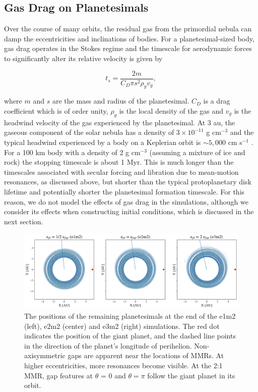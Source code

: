 \subsection{Gas Drag on Planetesimals}\label{sec:pl_drag}

Over the course of many orbits, the residual gas from the primordial nebula can damp the eccentricities and inclinations of 
bodies. For a planetesimal-sized body, gas drag operates in the Stokes regime and the timescale for aerodynamic forces to 
significantly alter its relative velocity is given by \cite{adachi76}

\begin{equation}\label{eq:ts_stokes}
    t_{s} = \frac{2 m}{C_{D} \pi s^{2} \rho_{g} v_{g}},
\end{equation}

\noindent where $m$ and $s$ are the mass and radius of the planetesimal. $C_{D}$ is a drag coefficient which is of order unity, 
$\rho_{g}$ is the local density of the gas and $v_{g}$ is the headwind velocity of the gas experienced by the planetesimal. At 3 
au, the gaseous component of the solar nebula has a density of $3 \times 10^{-11}$ g cm$^{-3}$ and the typical headwind 
experienced by a body on a Keplerian orbit is $\sim 5,000$ cm s$^{-1}$ \cite{hayashi81}. For a 100 km body with a density of 2 g 
cm$^{-3}$ (assuming a mixture of ice and rock) the stopping timescale is about 1 Myr. This is much longer than the timescales 
associated with secular forcing and libration due to mean-motion resonances, as discussed above, but shorter than the typical 
protoplanetary disk lifetime and potentially shorter the planetesimal formation timescale. For this reason, we do not model the 
effects of gas drag in the simulations, although we consider its effects when constructing initial conditions, which is discussed in 
the next section.

\begin{figure}
\begin{center}
    \includegraphics[width=\textwidth]{figures/grind/xy.png}
    \caption{The positions of the remaining planetesimals at the end of the e1m2 (left), e2m2 (center) and e3m2 (right) 
    simulations. The red dot indicates the position of the giant planet, and the dashed line points in the direction of the planet's 
    longitude of perihelion. Non-axisymmetric gaps are apparent near the locations of MMRs. At higher eccentricities, more 
    resonances become visible. At the 2:1 MMR, gap features at $\theta$ = 0 
    and $\theta = \pi$ follow the giant planet in its orbit.\label{fig:xy}}
\end{center}
\end{figure}

